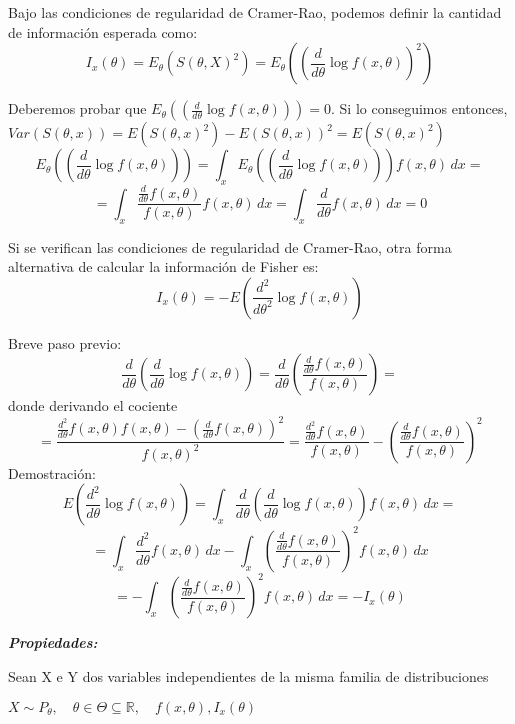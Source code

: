 Bajo las condiciones de regularidad de Cramer-Rao, podemos definir la cantidad
de información esperada como:
\[
    I_x(\theta)=E_\theta(S(\theta,X)^2)=E_\theta\left(\left(\frac{d}{d \theta} \log f(x,\theta)\right)^2\right)
\]

\begin{proofs}
    Deberemos probar que $E_\theta(\left(\frac{d}{d \theta} \log f(x,\theta)\right))=0$. Si lo conseguimos entonces, $Var(S(\theta,x))=E(S(\theta,x)^2)-E(S(\theta,x))^2=E(S(\theta,x)^2)$
    \[
        E_\theta\left(\left(\frac{d}{d \theta} \log f(x,\theta)\right)\right)=\int_{x} E_\theta\left(\left(\frac{d}{d \theta} \log f(x,\theta)\right)\right)  f(x,\theta) \,dx =
    \]
    \[
        =\int_{x} \frac{\frac{d}{d \theta} f(x,\theta)}{f(x,\theta)}  f(x,\theta) \,dx=\int_{x} \frac{d}{d \theta} f(x,\theta) \,dx = 0
    \]
\end{proofs}

Si se verifican las condiciones de regularidad de Cramer-Rao, otra forma alternativa de calcular la información de Fisher es:
\[
    I_x(\theta)=-E\left(\frac{d^2}{d \theta^2} \log f(x,\theta)\right)
\]

\begin{proofs}
    Breve paso previo:
    \[
        \frac{d}{d \theta}\left(\frac{d}{d \theta} \log f(x,\theta)\right)=\frac{d}{d \theta}\left(\frac{\frac{d}{d \theta} f(x,\theta)}{f(x,\theta)}\right)=
    \]
    donde derivando el cociente
    \[
        =\frac{\frac{d^2}{d \theta} f(x,\theta) f(x,\theta) -\left(\frac{d}{d \theta} f(x,\theta)\right)^2}{f(x,\theta)^2}=\frac{\frac{d^2}{d \theta} f(x,\theta)}{f(x,\theta)} -\left(\frac{\frac{d}{d \theta} f(x,\theta)}{f(x,\theta)}\right)^2
    \]
    Demostración:
    \[
        E\left(\frac{d^2}{d \theta} \log f(x,\theta)\right)=\int_{x} \frac{d}{d \theta}\left(\frac{d}{d \theta} \log f(x,\theta)\right)  f(x,\theta) \,dx =
    \]
    \[
        =\int_{x} \frac{d^2}{d \theta} f(x, \theta) \,dx - \int_{x}\left(\frac{\frac{d}{d \theta} f(x,\theta)}{f(x,\theta)}\right)^2  f(x,\theta) \,dx
    \]
    \[
        = -\int_{x}\left(\frac{\frac{d}{d \theta} f(x,\theta)}{f(x,\theta)}\right)^2  f(x,\theta) \,dx=-I_x(\theta)
    \]
\end{proofs}

\textbf{\textit{Propiedades:}}

Sean X e Y dos variables independientes de la misma familia de distribuciones

$X \sim P_\theta, \quad \theta \in \Theta \subseteq \mathbb{R}, \quad f(x,\theta), I_x(\theta)$

